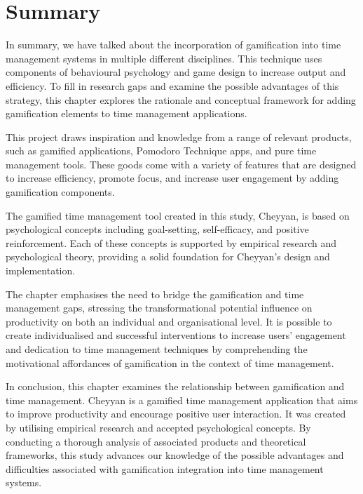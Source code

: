 \documentclass{l4proj}
\begin{document}
\section{Summary}
In summary, we have talked about the incorporation of gamification into time management systems in multiple different disciplines. This technique uses components of behavioural psychology and game design to increase output and efficiency. To fill in research gaps and examine the possible advantages of this strategy, this chapter explores the rationale and conceptual framework for adding gamification elements to time management applications.

This project draws inspiration and knowledge from a range of relevant products, such as gamified applications, Pomodoro Technique apps, and pure time management tools. These goods come with a variety of features that are designed to increase efficiency, promote focus, and increase user engagement by adding gamification components.

The gamified time management tool created in this study, Cheyyan, is based on psychological concepts including goal-setting, self-efficacy, and positive reinforcement. Each of these concepts is supported by empirical research and psychological theory, providing a solid foundation for Cheyyan's design and implementation.

The chapter emphasises the need to bridge the gamification and time management gaps, stressing the transformational potential influence on productivity on both an individual and organisational level. It is possible to create individualised and successful interventions to increase users' engagement and dedication to time management techniques by comprehending the motivational affordances of gamification in the context of time management.

In conclusion, this chapter examines the relationship between gamification and time management. Cheyyan is a gamified time management application that aims to improve productivity and encourage positive user interaction. It was created by utilising empirical research and accepted psychological concepts. By conducting a thorough analysis of associated products and theoretical frameworks, this study advances our knowledge of the possible advantages and difficulties associated with gamification integration into time management systems.






\end{document}
